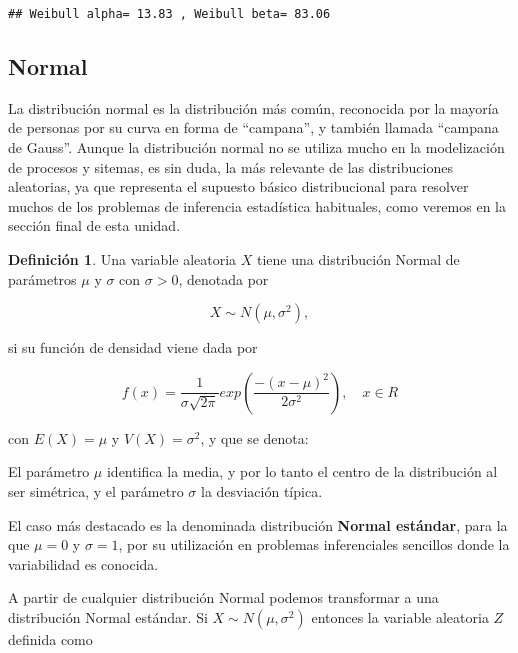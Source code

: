 \documentclass[
]{book}
\newenvironment{yellowbox}{
  \definecolor{shadecolor}{rgb}{210, 180, 140}  
  \color{black}
  \begin{shaded}}
 {\end{shaded}}
\theoremstyle{definition}
\newtheorem{definition}{Definición}[chapter]
\theoremstyle{definition}
\theoremstyle{definition}
\theoremstyle{definition}
\theoremstyle{remark}
\begin{document}
\begin{verbatim}
## Weibull alpha= 13.83 , Weibull beta= 83.06
\end{verbatim}

\hypertarget{normal}{%
\subsection{Normal}\label{normal}}

La distribución normal es la distribución más común, reconocida por la mayoría de personas por su curva en forma de ``campana'', y también llamada ``campana de Gauss''. Aunque la distribución normal no se utiliza mucho en la modelización de procesos y sitemas, es sin duda, la más relevante de las distribuciones aleatorias, ya que representa el supuesto básico distribucional para resolver muchos de los problemas de inferencia estadística habituales, como veremos en la sección final de esta unidad.

\begin{yellowbox}

\begin{definition}
\protect\hypertarget{def:vnormal}{}\label{def:vnormal}Una variable aleatoria \(X\) tiene una distribución Normal de parámetros \(\mu\) y \(\sigma\) con \(\sigma >0\), denotada por

\[ X \sim N(\mu, \sigma^2),\]

si su función de densidad viene dada por

\begin{equation}
f(x) = \frac{1}{\sigma\sqrt{2\pi}} exp\left(\frac{-(x-\mu)^2}{2\sigma^2}\right), \quad x \in R
\end{equation}

con \(E(X) = \mu\) y \(V(X) = \sigma^2\), y que se denota:
\end{definition}

\end{yellowbox}

El parámetro \(\mu\) identifica la media, y por lo tanto el centro de la distribución al ser simétrica, y el parámetro \(\sigma\) la desviación típica.

El caso más destacado es la denominada distribución \textbf{Normal estándar}, para la que \(\mu = 0\) y \(\sigma = 1\), por su utilización en problemas inferenciales sencillos donde la variabilidad es conocida.

A partir de cualquier distribución Normal podemos transformar a una distribución Normal estándar. Si \(X \sim N(\mu, \sigma^2)\) entonces la variable aleatoria \(Z\) definida como
\end{document}
